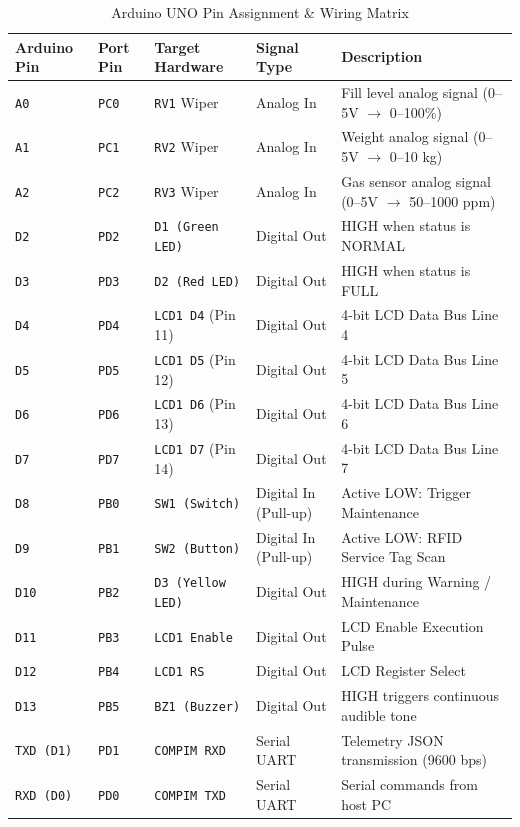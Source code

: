\documentclass[12pt,a4paper]{article}
\begin{document}
\begin{table}[H]
\centering
\caption{Arduino UNO Pin Assignment \& Wiring Matrix}
\label{tab:pinout}
\small
\begin{tabular}{@{}lllll@{}}
\toprule
\textbf{Arduino Pin} & \textbf{Port Pin} & \textbf{Target Hardware} & \textbf{Signal Type} & \textbf{Description} \\
\midrule
\texttt{A0} & \texttt{PC0} & \texttt{RV1} Wiper & Analog In & Fill level analog signal (0--5V $\rightarrow$ 0--100\%) \\
\texttt{A1} & \texttt{PC1} & \texttt{RV2} Wiper & Analog In & Weight analog signal (0--5V $\rightarrow$ 0--10 kg) \\
\texttt{A2} & \texttt{PC2} & \texttt{RV3} Wiper & Analog In & Gas sensor analog signal (0--5V $\rightarrow$ 50--1000 ppm) \\
\texttt{D2} & \texttt{PD2} & \texttt{D1 (Green LED)} & Digital Out & HIGH when status is NORMAL \\
\texttt{D3} & \texttt{PD3} & \texttt{D2 (Red LED)}   & Digital Out & HIGH when status is FULL \\
\texttt{D4} & \texttt{PD4} & \texttt{LCD1 D4} (Pin 11)& Digital Out & 4-bit LCD Data Bus Line 4 \\
\texttt{D5} & \texttt{PD5} & \texttt{LCD1 D5} (Pin 12)& Digital Out & 4-bit LCD Data Bus Line 5 \\
\texttt{D6} & \texttt{PD6} & \texttt{LCD1 D6} (Pin 13)& Digital Out & 4-bit LCD Data Bus Line 6 \\
\texttt{D7} & \texttt{PD7} & \texttt{LCD1 D7} (Pin 14)& Digital Out & 4-bit LCD Data Bus Line 7 \\
\texttt{D8} & \texttt{PB0} & \texttt{SW1 (Switch)}   & Digital In (Pull-up)& Active LOW: Trigger Maintenance \\
\texttt{D9} & \texttt{PB1} & \texttt{SW2 (Button)}   & Digital In (Pull-up)& Active LOW: RFID Service Tag Scan \\
\texttt{D10}& \texttt{PB2} & \texttt{D3 (Yellow LED)}& Digital Out & HIGH during Warning / Maintenance \\
\texttt{D11}& \texttt{PB3} & \texttt{LCD1 Enable}    & Digital Out & LCD Enable Execution Pulse \\
\texttt{D12}& \texttt{PB4} & \texttt{LCD1 RS}        & Digital Out & LCD Register Select \\
\texttt{D13}& \texttt{PB5} & \texttt{BZ1 (Buzzer)}   & Digital Out & HIGH triggers continuous audible tone \\
\texttt{TXD (D1)} & \texttt{PD1} & \texttt{COMPIM RXD} & Serial UART & Telemetry JSON transmission (9600 bps) \\
\texttt{RXD (D0)} & \texttt{PD0} & \texttt{COMPIM TXD} & Serial UART & Serial commands from host PC \\
\bottomrule
\end{tabular}
\end{table}
\end{document}

